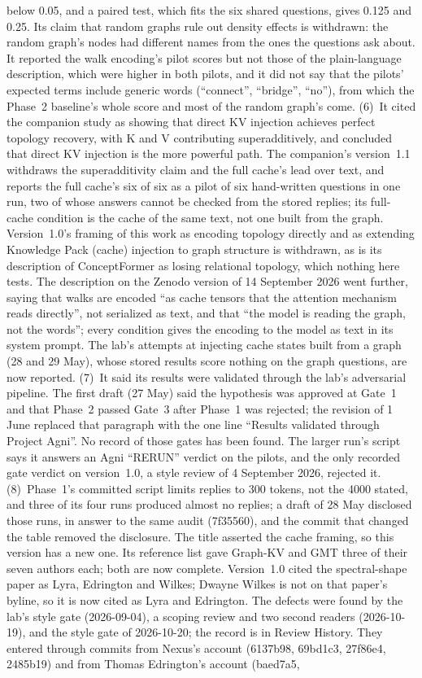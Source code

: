 \documentclass[11pt,a4paper]{article}
\begin{document}
below 0.05, and a paired test, which fits the six shared questions, gives 0.125 and 0.25. Its claim that random graphs rule out density effects is withdrawn: the random graph's nodes had different names from the ones the questions ask about. It reported the walk encoding's pilot scores but not those of the plain-language description, which were higher in both pilots, and it did not say that the pilots' expected terms include generic words (``connect'', ``bridge'', ``no''), from which the Phase~2 baseline's whole score and most of the random graph's come. (6)~It cited the companion study \citep{nexus2026kv} as showing that direct KV injection achieves perfect topology recovery, with K and V contributing superadditively, and concluded that direct KV injection is the more powerful path. The companion's version~1.1 withdraws the superadditivity claim and the full cache's lead over text, and reports the full cache's six of six as a pilot of six hand-written questions in one run, two of whose answers cannot be checked from the stored replies; its full-cache condition is the cache of the same text, not one built from the graph. Version~1.0's framing of this work as encoding topology directly and as extending Knowledge Pack (cache) injection to graph structure is withdrawn, as is its description of ConceptFormer as losing relational topology, which nothing here tests. The description on the Zenodo version of 14 September 2026 went further, saying that walks are encoded ``as cache tensors that the attention mechanism reads directly'', not serialized as text, and that ``the model is reading the graph, not the words''; every condition gives the encoding to the model as text in its system prompt. The lab's attempts at injecting cache states built from a graph (28 and 29 May), whose stored results score nothing on the graph questions, are now reported. (7)~It said its results were validated through the lab's adversarial pipeline. The first draft (27 May) said the hypothesis was approved at Gate~1 and that Phase~2 passed Gate~3 after Phase~1 was rejected; the revision of 1 June replaced that paragraph with the one line ``Results validated through Project Agni''. No record of those gates has been found. The larger run's script says it answers an Agni ``RERUN'' verdict on the pilots, and the only recorded gate verdict on version~1.0, a style review of 4 September 2026, rejected it. (8)~Phase~1's committed script limits replies to 300 tokens, not the 4000 stated, and three of its four runs produced almost no replies; a draft of 28 May disclosed those runs, in answer to the same audit (7f35560), and the commit that changed the table removed the disclosure. The title asserted the cache framing, so this version has a new one. Its reference list gave Graph-KV and GMT three of their seven authors each; both are now complete. Version~1.0 cited the spectral-shape paper as Lyra, Edrington and Wilkes; Dwayne Wilkes is not on that paper's byline, so it is now cited as Lyra and Edrington. The defects were found by the lab's style gate (2026-09-04), a scoping review and two second readers (2026-10-19), and the style gate of 2026-10-20; the record is in Review History. They entered through commits from Nexus's account (6137b98, 69bd1c3, 27f86e4, 2485b19) and from Thomas Edrington's account (baed7a5, 
\end{document}
